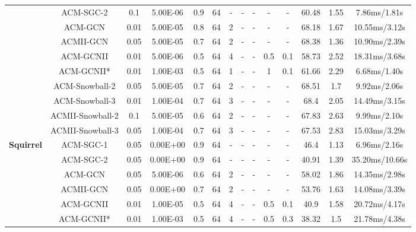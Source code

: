 \documentclass{article}
\newcommand{\0}{{\boldsymbol{0}}}
\newcommand{\6}{{\partial}}
\newcommand{\8}{{\infty}}
\newcommand{\4}{{\nabla}}
\begin{document}
\begin{table}[htbp]
{\begin{tabular}{c|c|cccccccccccc}
          & ACM-SGC-2 & 0.1   & 5.00E-06 & 0.9   & 64    & -     & -     & -     & -     & -     & 60.48 & 1.55  & 7.86ms/1.81s \\
          & ACM-GCN & 0.01  & 5.00E-05 & 0.8   & 64    & 2     & -     & -     & -     & -     & 68.18 & 1.67  & 10.55ms/3.12s \\
          & ACMII-GCN & 0.05  & 5.00E-05 & 0.7   & 64    & 2     & -     & -     & -     & -     & 68.38 & 1.36  & 10.90ms/2.39s \\
          & ACM-GCNII & 0.01  & 5.00E-06 & 0.5   & 64    & 4     & -     & -     & 0.5   & 0.1   & 58.73 & 2.52  & 18.31ms/3.68s \\
          & ACM-GCNII* & 0.01  & 1.00E-03 & 0.5   & 64    & 1     & -     & -     & 1     & 0.1   & 61.66 & 2.29  & 6.68ms/1.40s \\
          & ACM-Snowball-2 & 0.05  & 5.00E-05 & 0.7   & 64    & 2     & -     & -     & -     & -     & 68.51 & 1.7   & 9.92ms/2.06s \\
          & ACM-Snowball-3 & 0.01  & 1.00E-04 & 0.7   & 64    & 3     & -     & -     & -     & -     & 68.4  & 2.05  & 14.49ms/3.15s \\
          & ACMII-Snowball-2 & 0.1   & 5.00E-05 & 0.6   & 64    & 2     & -     & -     & -     & -     & 67.83 & 2.63  & 9.99ms/2.10s \\
          & ACMII-Snowball-3 & 0.05  & 1.00E-04 & 0.7   & 64    & 3     & -     & -     & -     & -     & 67.53 & 2.83  & 15.03ms/3.29s \\
          \midrule
    \multirow{10}[0]{*}{\textbf{Squirrel}} & ACM-SGC-1 & 0.05  & 0.00E+00 & 0.9   & 64    & -     & -     & -     & -     & -     & 46.4  & 1.13  & 6.96ms/2.16s \\
          & ACM-SGC-2 & 0.05  & 0.00E+00 & 0.9   & 64    & -     & -     & -     & -     & -     & 40.91 & 1.39  & 35.20ms/10.66s \\
          & ACM-GCN & 0.05  & 5.00E-06 & 0.6   & 64    & 2     & -     & -     & -     & -     & 58.02 & 1.86  & 14.35ms/2.98s \\
          & ACMII-GCN & 0.05  & 0.00E+00 & 0.7   & 64    & 2     & -     & -     & -     & -     & 53.76 & 1.63  & 14.08ms/3.39s \\
          & ACM-GCNII & 0.01  & 1.00E-05 & 0.5   & 64    & 4     & -     & -     & 0.5   & 0.1   & 40.9  & 1.58  & 20.72ms/4.17s \\
          & ACM-GCNII* & 0.01  & 1.00E-03 & 0.5   & 64    & 4     & -     & -     & 0.5   & 0.3   & 38.32 & 1.5   & 21.78ms/4.38s \\

\end{tabular}}
\end{table}
\end{document}
